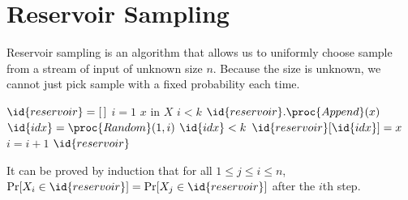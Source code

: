 \section{Reservoir Sampling}

Reservoir sampling is an algorithm that allows us to uniformly choose sample from a stream of input of unknown size $n$. Because the size is unknown, we cannot just pick sample with a fixed probability each time.

\begin{codebox}
    \li $\id{reservoir} = [\,]$
    \li $i = 1$ 
    \li \For $x$ in $X$ \Do
        \li \If $i < k$ \Then
            \li $\id{reservoir}.\proc{Append}(x)$ 
            \End
        \li $\id{idx} = \proc{Random}(1,i)$
        \li \If $\id{idx} < k$ \Then
            \li $\id{reservoir}[\id{idx}] = x$
            \End
        \li $i = i + 1$
        \End
    \li \Return $\id{reservoir}$  
\end{codebox}

It can be proved by induction that for all $1 \leq j \leq i \leq n$, $\Pr[X_i \in \id{reservoir}] = \Pr[X_j \in \id{reservoir}]$ after the $i$th step. 